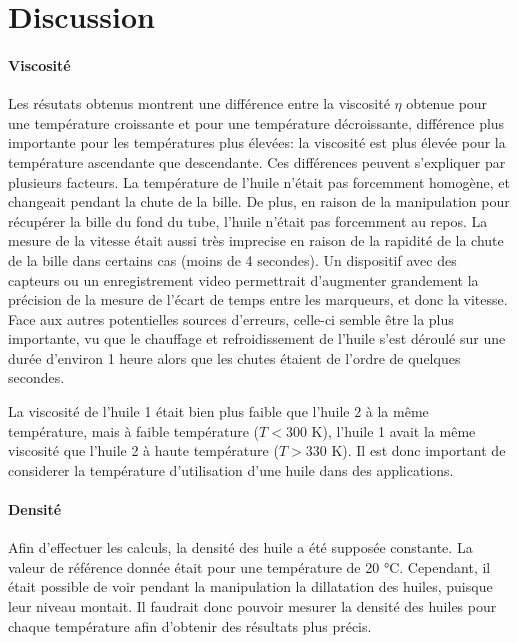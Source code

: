 \section{Discussion}

\paragraph{Viscosité} Les résutats obtenus montrent une différence entre la viscosité \(\eta\) obtenue pour une température croissante et pour une température décroissante, différence plus importante pour les températures plus élevées: la viscosité est plus élevée pour la température ascendante que descendante. Ces différences peuvent s'expliquer par plusieurs facteurs. La température de l'huile n'était pas forcemment homogène, et changeait pendant la chute de la bille. De plus, en raison de la manipulation pour récupérer la bille du fond du tube, l'huile n'était pas forcemment au repos. La mesure de la vitesse était aussi très imprecise en raison de la rapidité de la chute de la bille dans certains cas (moins de 4 secondes). Un dispositif avec des capteurs ou un enregistrement video permettrait d'augmenter grandement la précision de la mesure de l'écart de temps entre les marqueurs, et donc la vitesse. Face aux autres potentielles sources d'erreurs, celle-ci semble être la plus importante, vu que le chauffage et refroidissement de l'huile s'est déroulé sur une durée d'environ 1 heure alors que les chutes étaient de l'ordre de quelques secondes.

La viscosité de l'huile 1 était bien plus faible que l'huile 2 à la même température, mais à faible température (\(T < 300\) \si{\kelvin}), l'huile 1 avait la même viscosité que l'huile 2 à haute température (\(T > 330\) \si{\kelvin}). Il est donc important de considerer la température d'utilisation d'une huile dans des applications.

\paragraph{Densité} Afin d'effectuer les calculs, la densité des huile a été supposée constante. La valeur de référence donnée était pour une température de 20 \si{\celsius}. Cependant, il était possible de voir pendant la manipulation la dillatation des huiles, puisque leur niveau montait. Il faudrait donc pouvoir mesurer la densité des huiles pour chaque température afin d'obtenir des résultats plus précis.
